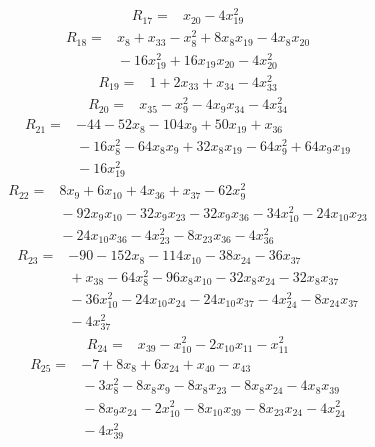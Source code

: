 \documentclass[11pt]{article}
\theoremstyle{definition}
\theoremstyle{remark}
\begin{document}
\begin{align*}
R_{17} ={}& x_{20} - 4x_{19}^{2}
\end{align*}
\begin{align*}
R_{18} ={}& x_{8} + x_{33} - x_{8}^{2} + 8x_{8} x_{19} - 4x_{8} x_{20} \\
&{} -16x_{19}^{2} + 16x_{19} x_{20} - 4x_{20}^{2}
\end{align*}
\begin{align*}
R_{19} ={}& 1 + 2x_{33} + x_{34} - 4x_{33}^{2}
\end{align*}
\begin{align*}
R_{20} ={}& x_{35} - x_{9}^{2} - 4x_{9} x_{34} - 4x_{34}^{2}
\end{align*}
\begin{align*}
R_{21} ={}& -44 - 52x_{8} - 104x_{9} + 50x_{19} + x_{36} \\
&{} -16x_{8}^{2} - 64x_{8} x_{9} + 32x_{8} x_{19} - 64x_{9}^{2} + 64x_{9} x_{19} \\
&{} -16x_{19}^{2}
\end{align*}
\begin{align*}
R_{22} ={}& 8x_{9} + 6x_{10} + 4x_{36} + x_{37} - 62x_{9}^{2} \\
&{} -92x_{9} x_{10} - 32x_{9} x_{23} - 32x_{9} x_{36} - 34x_{10}^{2} - 24x_{10} x_{23} \\
&{} -24x_{10} x_{36} - 4x_{23}^{2} - 8x_{23} x_{36} - 4x_{36}^{2}
\end{align*}
\begin{align*}
R_{23} ={}& -90 - 152x_{8} - 114x_{10} - 38x_{24} - 36x_{37} \\
&{} + x_{38} - 64x_{8}^{2} - 96x_{8} x_{10} - 32x_{8} x_{24} - 32x_{8} x_{37} \\
&{} -36x_{10}^{2} - 24x_{10} x_{24} - 24x_{10} x_{37} - 4x_{24}^{2} - 8x_{24} x_{37} \\
&{} -4x_{37}^{2}
\end{align*}
\begin{align*}
R_{24} ={}& x_{39} - x_{10}^{2} - 2x_{10} x_{11} - x_{11}^{2}
\end{align*}
\begin{align*}
R_{25} ={}& -7 + 8x_{8} + 6x_{24} + x_{40} - x_{43} \\
&{} -3x_{8}^{2} - 8x_{8} x_{9} - 8x_{8} x_{23} - 8x_{8} x_{24} - 4x_{8} x_{39} \\
&{} -8x_{9} x_{24} - 2x_{10}^{2} - 8x_{10} x_{39} - 8x_{23} x_{24} - 4x_{24}^{2} \\
&{} -4x_{39}^{2}
\end{align*}
\end{document}
